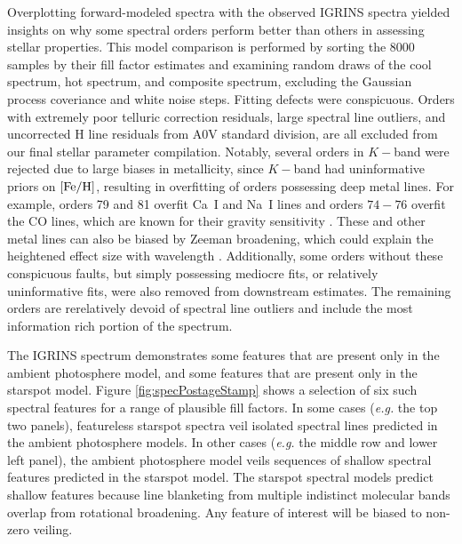 \documentclass[twocolumn]{emulateapj}%
\begin{document}
Overplotting forward-modeled spectra with the observed IGRINS spectra yielded insights on why some spectral orders perform better than others in assessing stellar properties.  This model comparison is performed by sorting the 8000 samples by their fill factor estimates and examining random draws of the cool spectrum, hot spectrum, and composite spectrum, excluding the Gaussian process coveriance and white noise steps.  Fitting defects were conspicuous.  Orders with extremely poor telluric correction residuals, large spectral line outliers, and uncorrected H line residuals from A0V standard division, are all excluded from our final stellar parameter compilation.  Notably, several orders in $K-$band were rejected due to large biases in metallicity, since $K-$band had uninformative priors on $[{\rm Fe}/{\rm H}]$, resulting in overfitting of orders possessing deep metal lines.  For example, orders 79 and 81 overfit Ca~I and Na~I lines and orders $74-76$ overfit the CO lines, which are known for their gravity sensitivity \citep{rayner09}.  These and other metal lines can also be biased by Zeeman broadening, which could explain the heightened effect size with wavelength \citep{johnskrull07,deen13}.  Additionally, some orders without these conspicuous faults, but simply possessing mediocre fits, or relatively uninformative fits, were also removed from downstream estimates.  The remaining orders are rerelatively devoid of spectral line outliers and include the most information rich portion of the spectrum.  

The IGRINS spectrum demonstrates some features that are present only in the ambient photosphere model, and some features that are present only in the starspot model.  Figure \ref{fig:specPostageStamp} shows a selection of six such spectral features for a range of plausible fill factors.  In some cases (\emph{e.g.} the top two panels), featureless starspot spectra veil isolated spectral lines predicted in the ambient photosphere models.  In other cases (\emph{e.g.} the middle row and lower left panel), the ambient photosphere model veils sequences of shallow spectral features predicted in the starspot model.  The starspot spectral models predict shallow features because line blanketing from multiple indistinct molecular bands overlap from rotational broadening.  Any feature of interest will be biased to non-zero veiling.  
\end{document}
